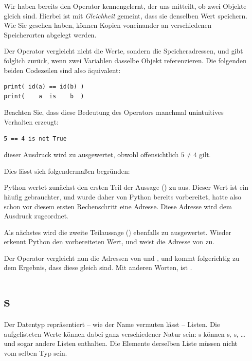 \begin{hintbox}[Vergleichsoperator \texttt{is} vs. \texttt{==}]
Wir haben bereits den Operator \inPy{==} kennengelernt, der uns mitteilt, ob zwei Objekte gleich sind. Hierbei ist mit \emph{Gleichheit} gemeint, dass sie denselben Wert speichern. Wie Sie gesehen haben, können Kopien voneinander an verschiedenen Speicherorten abgelegt werden.

Der Operator  vergleicht nicht die Werte, sondern die Speicheradressen, und gibt folglich  zurück, wenn zwei Variablen dasselbe Objekt referenzieren. Die folgenden beiden Codezeilen sind also äquivalent:
\begin{codebox}
\begin{verbatim}
print( id(a) == id(b) )
print(    a  is    b  )
\end{verbatim}
\end{codebox}
\end{hintbox}
%
\begin{hintbox}[]
Beachten Sie, dass diese Bedeutung des Operators  manchmal unintuitives Verhalten erzeugt:
\begin{warnbox}
\begin{verbatim}
5 == 4 is not True
\end{verbatim}
\end{warnbox}
dieser Ausdruck wird zu  ausgewertet, obwohl offensichtlich $5 \neq 4$ gilt.

Dies lässt sich folgendermaßen begründen:

Python wertet zunächst den ersten Teil der Aussage () zu  aus. Dieser Wert ist ein häufig gebrauchter, und wurde daher von Python bereits vorbereitet, hatte also schon vor diesem ersten Rechenschritt eine Adresse. Diese Adresse wird dem Ausdruck  zugeordnet.

Als nächstes wird die zweite Teilaussage () ebenfalls zu  ausgewertet. Wieder erkennt Python den vorbereiteten Wert, und weist  die Adresse von  zu.

Der Operator  vergleicht nun die Adressen von  und , und kommt folgerichtig zu dem Ergebnis, dass diese gleich sind. Mit anderen Worten,  ist .
\end{hintbox}


\section{s}
Der Datentyp  repräsentiert -- wie der Name vermuten lässt -- Listen. Die aufgelisteten Werte können dabei ganz verschiedener Natur sein: s können s, s, \ldots und sogar andere Listen enthalten. Die Elemente derselben Liste müssen nicht vom selben Typ sein.

